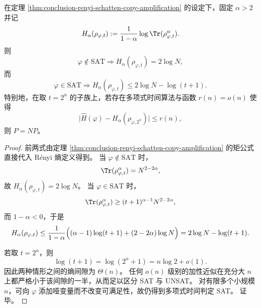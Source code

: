 \begin{corollary}\label{cor:conclusion-renyi-entropy-copy-amplification}
在定理 \ref{thm:conclusion-renyi-schatten-copy-amplification} 的设定下，固定 \(\alpha>2\) 并记
\[
H_\alpha(\rho_{\varphi,t})
:=
\frac{1}{1-\alpha}\log \Tr(\rho_{\varphi,t}^\alpha).
\]
则
\[
\varphi\notin\mathrm{SAT}
\Longrightarrow
H_\alpha(\rho_{\varphi,t})=2\log N,
\]
而
\[
\varphi\in\mathrm{SAT}
\Longrightarrow
H_\alpha(\rho_{\varphi,t})\le 2\log N-\log(t+1).
\]
特别地，在取 \(t=2^n\) 的子族上，若存在多项式时间算法与函数 \(r(n)=o(n)\) 使得
\[
\bigl|\widehat H(\varphi)-H_\alpha(\rho_{\varphi,2^n})\bigr|\le r(n),
\]
则 \(P=NP\)。
\end{corollary}
\begin{proof}
前两式由定理 \ref{thm:conclusion-renyi-schatten-copy-amplification} 的矩公式直接代入 Rényi 熵定义得到。
当 \(\varphi\notin\mathrm{SAT}\) 时，
\[
\Tr(\rho_{\varphi,t}^\alpha)=N^{2-2\alpha},
\]
故 \(H_\alpha(\rho_{\varphi,t})=2\log N\)。
当 \(\varphi\in\mathrm{SAT}\) 时，
\[
\Tr(\rho_{\varphi,t}^\alpha)\ge (t+1)^{\alpha-1}N^{2-2\alpha},
\]
而 \(1-\alpha<0\)，于是
\[
H_\alpha(\rho_{\varphi,t})
\le
\frac{1}{1-\alpha}\Bigl((\alpha-1)\log(t+1)+(2-2\alpha)\log N\Bigr)
=
2\log N-\log(t+1).
\]

若取 \(t=2^n\)，则
\[
\log(t+1)=\log(2^n+1)=n\log 2+o(1).
\]
因此两种情形之间的熵间隙为 \(\Theta(n)\)。
任何 \(o(n)\) 级别的加性近似在充分大 \(n\) 上都严格小于该间隙的一半，从而足以区分 SAT 与 UNSAT。
对有限多个小规模 \(n\)，可向 \(\varphi\) 添加哑变量而不改变可满足性，故仍得到多项式时间判定 SAT。
证毕。
\end{proof}


